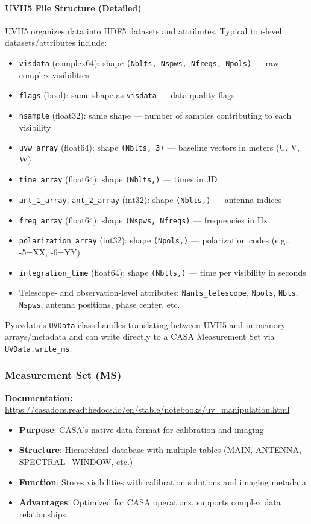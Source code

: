 \documentclass[11pt]{article}
\begin{document}
\paragraph{UVH5 File Structure (Detailed)}
UVH5 organizes data into HDF5 datasets and attributes. Typical top-level datasets/attributes include:
\begin{itemize}
    \item \texttt{visdata} (complex64): shape \texttt{(Nblts, Nspws, Nfreqs, Npols)} — raw complex visibilities
    \item \texttt{flags} (bool): same shape as \texttt{visdata} — data quality flags
    \item \texttt{nsample} (float32): same shape — number of samples contributing to each visibility
    \item \texttt{uvw\_array} (float64): shape \texttt{(Nblts, 3)} — baseline vectors in meters (U, V, W)
    \item \texttt{time\_array} (float64): shape \texttt{(Nblts,)} — times in JD
    \item \texttt{ant\_1\_array}, \texttt{ant\_2\_array} (int32): shape \texttt{(Nblts,)} — antenna indices
    \item \texttt{freq\_array} (float64): shape \texttt{(Nspws, Nfreqs)} — frequencies in Hz
    \item \texttt{polarization\_array} (int32): shape \texttt{(Npols,)} — polarization codes (e.g., -5=XX, -6=YY)
    \item \texttt{integration\_time} (float64): shape \texttt{(Nblts,)} — time per visibility in seconds
    \item Telescope- and observation-level attributes: \texttt{Nants\_telescope}, \texttt{Npols}, \texttt{Nbls}, \texttt{Nspws}, antenna positions, phase center, etc.
\end{itemize}
Pyuvdata's \texttt{UVData} class handles translating between UVH5 and in-memory arrays/metadata and can write directly to a CASA Measurement Set via \texttt{UVData.write\_ms}.

\subsubsection{Measurement Set (MS)}
\textbf{Documentation:} \url{https://casadocs.readthedocs.io/en/stable/notebooks/uv\_manipulation.html}
\begin{itemize}
    \item \textbf{Purpose}: CASA's native data format for calibration and imaging
    \item \textbf{Structure}: Hierarchical database with multiple tables (MAIN, ANTENNA, SPECTRAL\_WINDOW, etc.)
    \item \textbf{Function}: Stores visibilities with calibration solutions and imaging metadata
    \item \textbf{Advantages}: Optimized for CASA operations, supports complex data relationships
\end{itemize}
\end{document}
